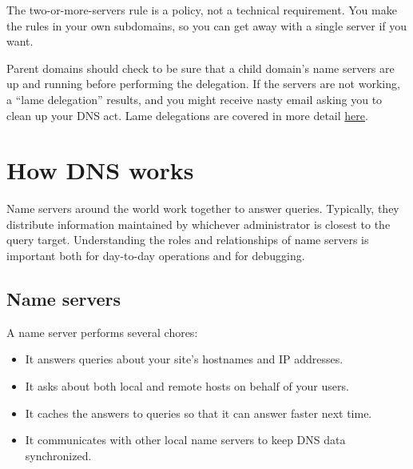 The two-or-more-servers rule is a policy, not a technical requirement.
You make the rules in your own subdomains, so you can get away with a
single server if you want.

Parent domains should check to be sure that a child domain's name
servers are up and running before performing the delegation. If the
servers are not working, a ``lame delegation'' results, and you might
receive nasty email asking you to clean up your DNS act. Lame
delegations are covered in more detail
\protect\hyperlink{part0024_split_072.htmlux5cux23_idTextAnchor966}{here}.




\section{How DNS works}

Name servers around the world work together to answer queries.
Typically, they distribute information maintained by whichever
administrator is closest to the {query} target. Understanding the roles
and relationships of name servers is important both for day-to-day
operations and for debugging.

\protect\hypertarget{part0024_split_011.html}{}{}

\hypertarget{part0024_split_011.htmlux5cux23_idContainer1069}{}
\hypertarget{part0024_split_011.htmlux5cux23calibre_pb_10}{%
\subsection[Name
servers]{\texorpdfstring{\protect\hypertarget{part0024_split_011.htmlux5cux23_idTextAnchor854}{}{}Name
servers}{Name servers}}\label{part0024_split_011.htmlux5cux23calibre_pb_10}}

\protect\hypertarget{part0024_split_011.htmlux5cux23_idIndexMarker2012}{}{}A
name server performs several chores:

\begin{itemize}
\item
  It answers queries about your site's hostnames and IP addresses.
\item
  It asks about both local and remote hosts on behalf of your users.
\item
  It caches the answers to queries so that it can answer faster next
  time.
\item
  It communicates with other local name servers to keep DNS data
  synchronized.
\end{itemize}

